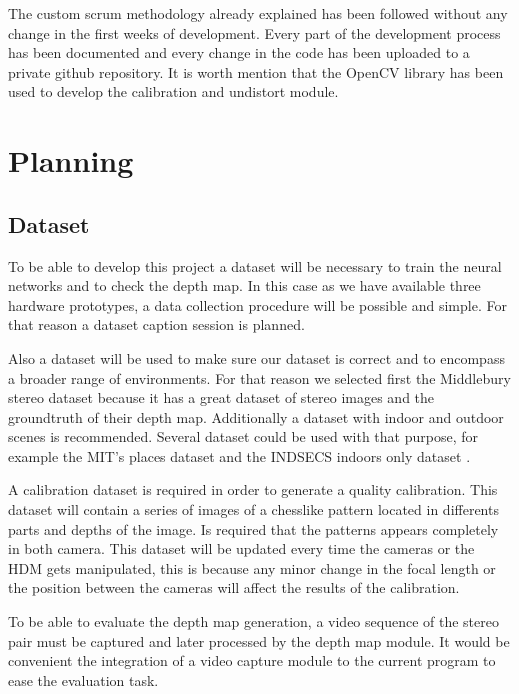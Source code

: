 \documentclass[10pt,a4paper,twocolumn,twoside]{article}
\begin{document}
	The custom scrum methodology already explained has been followed without any change in the first weeks of development. Every part of the development process has been documented and every change in the code has been uploaded to a private github repository. It is worth mention that the OpenCV \cite{web:opencv} library has been used to develop the calibration and undistort module. 
	
	\section{Planning}
	\label{sec:planning}
	
	\subsection{Dataset}
	\label{subsec:dataset}
	To be able to develop this project a dataset will be necessary to train the neural networks and to check the depth map. In this case as we have available three hardware prototypes, a data collection procedure will be possible and simple. For that reason a dataset caption session is planned.
	
	Also a dataset will be used to make sure our dataset is correct and to encompass a broader range of environments. For that reason we selected first the Middlebury stereo dataset \cite{web:middelburyDataset} because it has a great dataset of stereo images and the groundtruth of their depth map. Additionally a dataset with indoor and outdoor scenes is recommended. Several dataset could be used with that purpose, for example the MIT's places dataset \cite{web:mitplaces} and the INDSECS indoors only dataset \cite{web:indecs}.
	
	A calibration dataset is required in order to generate a quality calibration. This dataset will contain a series of images of a chesslike pattern located in differents parts and depths of the image. Is required that the patterns appears completely in both camera. This dataset will be updated every time the cameras or the HDM gets manipulated, this is because any minor change in the focal length or the position between the cameras will affect the results of the calibration.
	
	To be able to evaluate the depth map generation, a video sequence of the stereo pair must be captured and later processed by the depth map module. It would be convenient the integration of a video capture module to the current program to ease the evaluation task.
	
\end{document}

